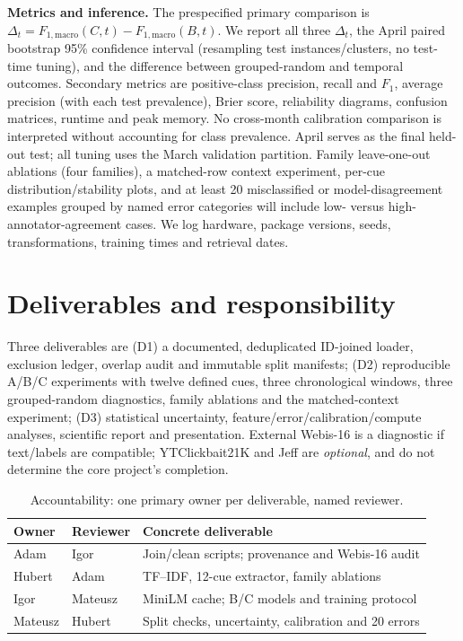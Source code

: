 \documentclass[11pt]{article}
\begin{document}
\textbf{Metrics and inference.} The prespecified primary comparison is \(\Delta_t=F_{1,\mathrm{macro}}(C,t)-F_{1,\mathrm{macro}}(B,t)\). We report all three $\Delta_t$, the April paired bootstrap 95\% confidence interval (resampling test instances/clusters, no test-time tuning), and the difference between grouped-random and temporal outcomes. Secondary metrics are positive-class precision, recall and $F_1$, average precision (with each test prevalence), Brier score, reliability diagrams, confusion matrices, runtime and peak memory. No cross-month calibration comparison is interpreted without accounting for class prevalence. April serves as the final held-out test; all tuning uses the March validation partition. Family leave-one-out ablations (four families), a matched-row context experiment, per-cue distribution/stability plots, and at least 20 misclassified or model-disagreement examples grouped by named error categories will include low- versus high-annotator-agreement cases. We log hardware, package versions, seeds, transformations, training times and retrieval dates.

\section{Deliverables and responsibility}
Three deliverables are (D1) a documented, deduplicated ID-joined loader, exclusion ledger, overlap audit and immutable split manifests; (D2) reproducible A/B/C experiments with twelve defined cues, three chronological windows, three grouped-random diagnostics, family ablations and the matched-context experiment; (D3) statistical uncertainty, feature/error/calibration/compute analyses, scientific report and presentation. External Webis-16 is a diagnostic if text/labels are compatible; YTClickbait21K and Jeff are \emph{optional}, and do not determine the core project's completion.

\begin{table}[t]
\centering\scriptsize\setlength{\tabcolsep}{3pt}
\caption{Accountability: one primary owner per deliverable, named reviewer.}\label{tab:roles}
\begin{tabularx}{\columnwidth}{@{}p{1.35cm}p{1.16cm}X@{}}\toprule
Owner & Reviewer & Concrete deliverable\\\midrule
Adam & Igor & Join/clean scripts; provenance and Webis-16 audit\\
Hubert & Adam & TF--IDF, 12-cue extractor, family ablations\\
Igor & Mateusz & MiniLM cache; B/C models and training protocol\\
Mateusz & Hubert & Split checks, uncertainty, calibration and 20 errors\\\bottomrule
\end{tabularx}
\end{table}
\end{document}
